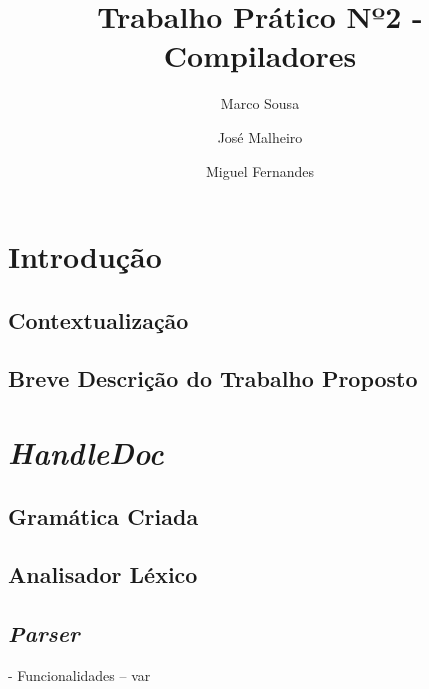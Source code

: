 \documentclass[runningheads]{llncs}
\begin{document}
%
\title{Trabalho Prático Nº2 - Compiladores}
%
%
\author{Marco Sousa \and
José Malheiro \and
Miguel Fernandes}
%
%
\maketitle              %
%
\begin{abstract}

\end{abstract}
%
%
%
\section{Introdução}
\subsection{Contextualização} 



\subsection{Breve Descrição do Trabalho Proposto}



\section{\textit{HandleDoc}}
\subsection{Gramática Criada} \label{subsec:grammar}

\subsection{Analisador Léxico} \label{subsec:lex}

\subsection{\textit{Parser}} \label{subsec:strat}

- Funcionalidades
-- var 
\end{document}
